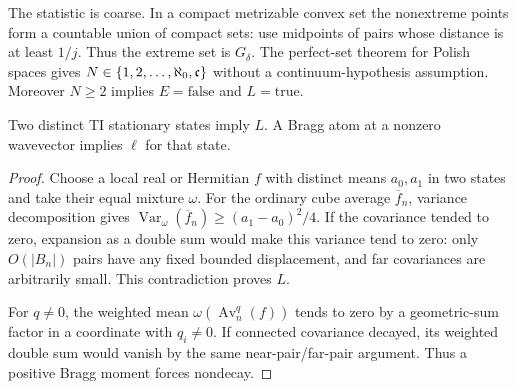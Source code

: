 The statistic is coarse. In a compact metrizable convex set the nonextreme points form a countable union of compact sets: use midpoints of pairs whose distance is at least $1/j$. Thus the extreme set is $G_\delta$. The perfect-set theorem for Polish spaces gives $N\in\{1,2,\ldots,\aleph_0,\mathfrak c\}$ without a continuum-hypothesis assumption. Moreover $N\ge2$ implies $E=\mathrm{false}$ and $L=\mathrm{true}$.
\begin{lemma}\label{lem:two-order}
Two distinct TI stationary states imply $L$. A Bragg atom at a nonzero wavevector implies $\ell$ for that state.
\end{lemma}
\begin{proof}
Choose a local real or Hermitian $f$ with distinct means $a_0,a_1$ in two states and take their equal mixture $\omega$. For the ordinary cube average $\overline f_n$, variance decomposition gives
$\operatorname{Var}_\omega(\overline f_n)\ge(a_1-a_0)^2/4$.
If the covariance tended to zero, expansion as a double sum would make this variance tend to zero: only $O(|B_n|)$ pairs have any fixed bounded displacement, and far covariances are arbitrarily small. This contradiction proves $L$.

For $q\ne0$, the weighted mean $\omega(\operatorname{Av}_n^q(f))$ tends to zero by a geometric-sum factor in a coordinate with $q_i\ne0$. If connected covariance decayed, its weighted double sum would vanish by the same near-pair/far-pair argument. Thus a positive Bragg moment forces nondecay.
\end{proof}
